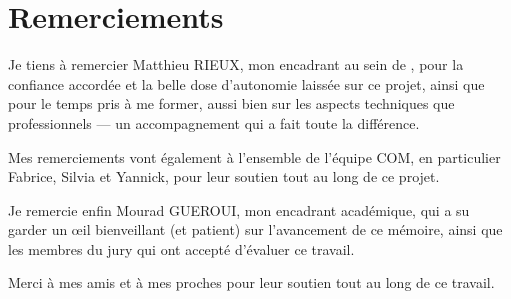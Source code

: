 \chapter*{Remerciements}

Je tiens à remercier Matthieu RIEUX, mon encadrant au sein de \Entreprise, pour
la confiance accordée et la belle dose d'autonomie laissée sur ce projet, ainsi
que pour le temps pris à me former, aussi bien sur les aspects techniques que
professionnels — un accompagnement qui a fait toute la différence.

\medskip
Mes remerciements vont également à l'ensemble de l'équipe COM, en particulier
Fabrice, Silvia et Yannick, pour leur soutien tout au long de ce projet.

\medskip
Je remercie enfin Mourad GUEROUI, mon encadrant académique, qui a su garder un
œil bienveillant (et patient) sur l'avancement de ce mémoire, ainsi que les
membres du jury qui ont accepté d'évaluer ce travail.

\medskip
Merci à mes amis et à mes proches pour leur soutien tout au long de ce travail.

\clearpage
